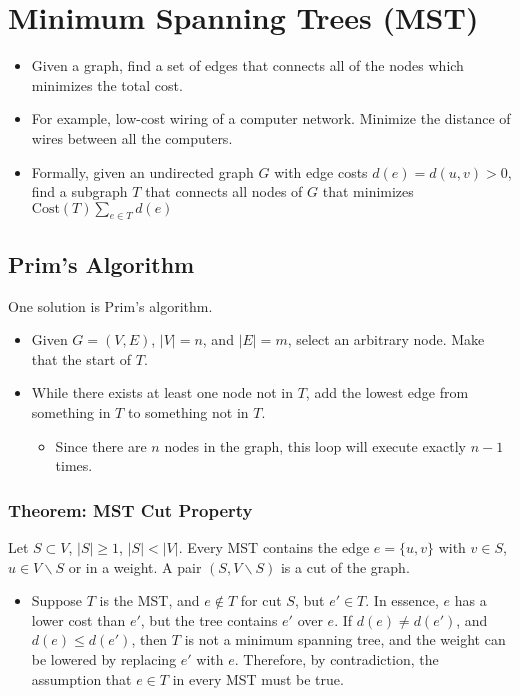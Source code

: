 \documentclass[10pt]{article}
\begin{document}
\section*{Minimum Spanning Trees (MST)}
\begin{itemize}
	\item Given a graph, find a set of edges that connects all of the nodes which minimizes the total cost.
	\item For example, low-cost wiring of a computer network.  Minimize the distance of wires between all the computers.
	\item Formally, given an undirected graph $G$ with edge costs $d(e) = d(u, v) > 0$, find a subgraph $T$ that connects all nodes of $G$ that minimizes $\text{Cost}(T) \sum_{e \in T} d(e)$
\end{itemize}
\subsection*{Prim's Algorithm}
One solution is Prim's algorithm.
\begin{itemize}
	\item Given $G = (V, E)$, $|V| = n$, and $|E| = m$, select an arbitrary node.  Make that the start of $T$.
	\item While there exists at least one node not in $T$, add the lowest edge from something in $T$ to something not in $T$.
	\begin{itemize}
	    \item Since there are $n$ nodes in the graph, this loop will execute exactly $n - 1$ times.
    \end{itemize}
\end{itemize}
\subsubsection*{Theorem: MST Cut Property}
Let $S \subset V$, $|S| \geq 1$, $|S| < |V|$.  Every MST contains the edge $e = \{u, v\}$ with $v \in S$, $u \in V \backslash S$ or in a weight.  A pair $(S, V \backslash S)$ is a cut of the graph.
\begin{itemize}
	\item Suppose $T$ is the MST, and $e \notin T$ for cut $S$, but $e' \in T$.  In essence, $e$ has a lower cost than $e'$, but the tree contains $e'$ over $e$.  If $d(e) \neq d(e')$, and $d(e) \leq d(e')$, then $T$ is not a minimum spanning tree, and the weight can be lowered by replacing $e'$ with $e$.  Therefore, by contradiction, the assumption that $e \in T$ in every MST must be true.
\end{itemize}
\end{document}
